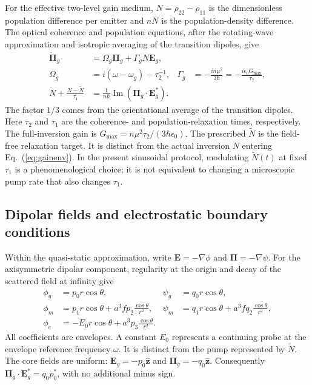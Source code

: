 \documentclass[9pt]{osa-supplemental-document}
\begin{document}
For the effective two-level gain medium, $N=\rho_{22}-\rho_{11}$ is the dimensionless population difference per emitter and $nN$ is the population-density difference. The optical coherence and population equations, after the rotating-wave approximation and isotropic averaging of the transition dipoles, give
\begin{align}
\dot{\bm\Pi}_g&=\Omega_g\bm\Pi_g+\Gamma_gN\mathbf E_g,\label{eq:gainenv}\\
\Omega_g&=i(\omega-\omega_g)-\tau_2^{-1},
&\Gamma_g&=-\frac{in\mu^2}{3\hbar}=-\frac{i\epsilon_0G_{\max}}{\tau_2},\label{eq:gaincoeff}\\
\dot N+\frac{N-\widetilde N}{\tau_1}
&=\frac{1}{n\hbar}\operatorname{Im}(\bm\Pi_g\cdot\mathbf E_g^*).
\label{eq:inversionvector}
\end{align}
The factor $1/3$ comes from the orientational average of the transition dipoles. Here $\tau_2$ and $\tau_1$ are the coherence- and population-relaxation times, respectively. The full-inversion gain is $G_{\max}=n\mu^2\tau_2/(3\hbar\epsilon_0)$. The prescribed $\widetilde N$ is the field-free relaxation target. It is distinct from the actual inversion $N$ entering Eq.~(\ref{eq:gainenv}). In the present sinusoidal protocol, modulating $\widetilde N(t)$ at fixed $\tau_1$ is a phenomenological choice; it is not equivalent to changing a microscopic pump rate that also changes $\tau_1$.

\subsection{Dipolar fields and electrostatic boundary conditions}
Within the quasi-static approximation, write $\mathbf E=-\nabla\phi$ and $\bm\Pi=-\nabla\psi$. For the axisymmetric dipolar component, regularity at the origin and decay of the scattered field at infinity give
\begin{align}
\phi_g&=p_0r\cos\theta,
&\psi_g&=q_0r\cos\theta,\label{eq:corepot}\\
\phi_m&=p_1r\cos\theta+a^3f p_2\frac{\cos\theta}{r^2},
&\psi_m&=q_1r\cos\theta+a^3f q_2\frac{\cos\theta}{r^2},\label{eq:metalpot}\\
\phi_e&=-E_0r\cos\theta+a^3p_3\frac{\cos\theta}{r^2}.
\label{eq:exteriorpot}
\end{align}
All coefficients are envelopes. A constant $E_0$ represents a continuing probe at the envelope reference frequency $\omega$. It is distinct from the pump represented by $\widetilde N$. The core fields are uniform: $\mathbf E_g=-p_0\hat{\mathbf z}$ and $\bm\Pi_g=-q_0\hat{\mathbf z}$. Consequently $\bm\Pi_g\cdot\mathbf E_g^*=q_0p_0^*$, with no additional minus sign.
\end{document}
